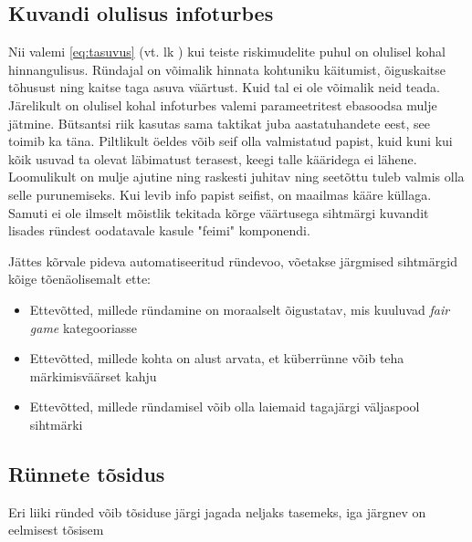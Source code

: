 \documentclass{article}
\begin{document}
\subsection{Kuvandi olulisus infoturbes}
Nii valemi \ref{eq:tasuvus} (vt. lk \pageref{eq:tasuvus}) kui teiste riskimudelite puhul on olulisel kohal hinnangulisus. Ründajal on võimalik hinnata kohtuniku käitumist, õiguskaitse tõhusust ning kaitse taga asuva väärtust. Kuid tal ei ole võimalik neid teada. Järelikult on olulisel kohal infoturbes valemi parameetritest ebasoodsa mulje jätmine. Bütsantsi riik kasutas sama taktikat juba aastatuhandete eest, see toimib ka täna. Piltlikult öeldes võib seif olla valmistatud papist, kuid kuni kui kõik usuvad ta olevat läbimatust terasest, keegi talle kääridega ei lähene. Loomulikult on mulje ajutine ning raskesti juhitav ning seetõttu tuleb valmis olla selle purunemiseks. Kui levib info papist seifist, on maailmas kääre küllaga. Samuti ei ole ilmselt mõistlik tekitada kõrge väärtusega sihtmärgi kuvandit lisades ründest oodatavale kasule "feimi" komponendi. 

Jättes kõrvale pideva automatiseeritud ründevoo, võetakse järgmised sihtmärgid kõige tõenäolisemalt ette:
\begin{itemize}
	\item Ettevõtted, millede ründamine on moraalselt õigustatav, mis kuuluvad \emph{fair game} kategooriasse
	\item Ettevõtted, millede kohta on alust arvata, et küberrünne võib teha märkimisväärset kahju
	\item Ettevõtted, millede ründamisel võib olla laiemaid tagajärgi väljaspool sihtmärki
\end{itemize}

\subsection{Rünnete tõsidus}
Eri liiki ründed võib tõsiduse järgi jagada neljaks tasemeks, iga järgnev on eelmisest tõsisem
\end{document}
